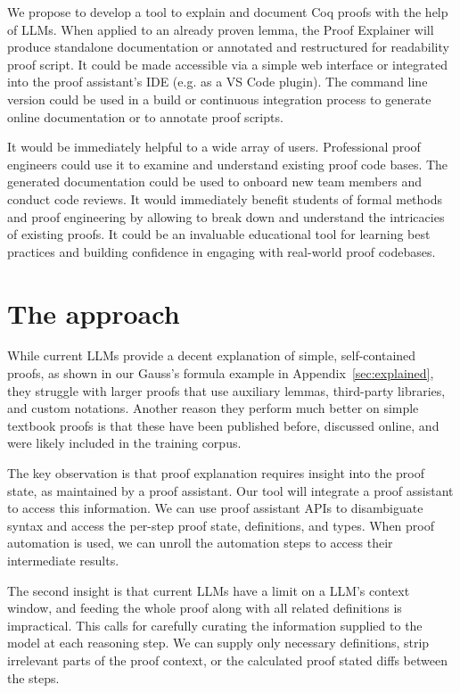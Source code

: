 \documentclass[10pt,nonacm,natbib=false]{acmart}
\begin{document}
We propose to develop a tool to explain and document Coq proofs with
the help of LLMs. When applied to an already proven lemma, the Proof
Explainer will produce standalone documentation or annotated and
restructured for readability proof script. It could be made accessible
via a simple web interface or integrated into the proof assistant’s
IDE (e.g. as a VS Code plugin). The command line version could be used
in a build or continuous integration process to generate online
documentation or to annotate proof scripts.

It would be immediately helpful to a wide array of users. Professional
proof engineers could use it to examine and understand existing proof
code bases. The generated documentation could be used to onboard new
team members and conduct code reviews. It would immediately benefit
students of formal methods and proof engineering by allowing to break
down and understand the intricacies of existing proofs. It could be an
invaluable educational tool for learning best practices and building
confidence in engaging with real-world proof codebases.

\section*{The approach}

While current LLMs provide a decent explanation of simple,
self-contained proofs, as shown in our Gauss's formula example in
Appendix~\ref{sec:explained}, they struggle with larger proofs that
use auxiliary lemmas, third-party libraries, and custom
notations. Another reason they perform much better on simple textbook
proofs is that these have been published before, discussed online, and
were likely included in the training corpus.

The key observation is that proof explanation requires insight into
the proof state, as maintained by a proof assistant. Our tool will
integrate a proof assistant to access this information. We can use
proof assistant APIs to disambiguate syntax and access the per-step
proof state, definitions, and types. When proof automation is used, we
can unroll the automation steps to access their intermediate results.

The second insight is that current LLMs have a limit on a LLM’s
context window, and feeding the whole proof along with all related
definitions is impractical. This calls for carefully curating the
information supplied to the model at each reasoning step. We can
supply only necessary definitions, strip irrelevant parts of the proof
context, or the calculated proof stated diffs between the steps.
\end{document}
